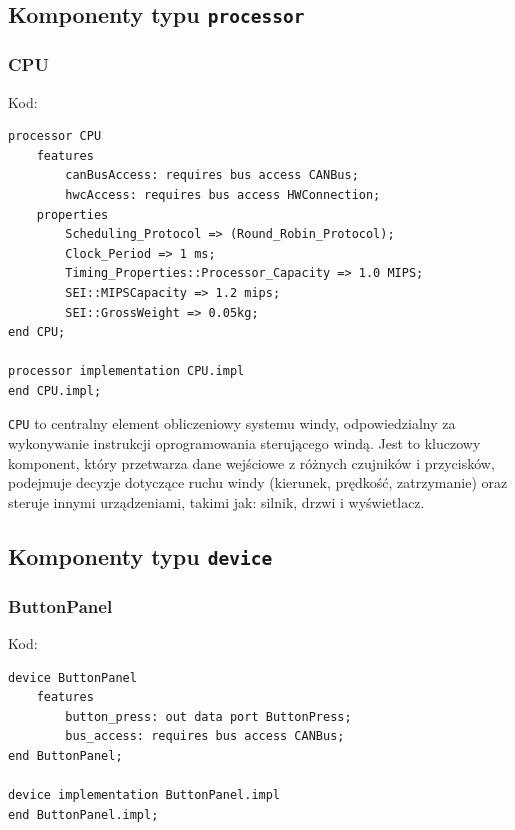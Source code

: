 \documentclass{article}
\begin{document}
    \subsection{Komponenty typu \texttt{processor}}

    
    \subsubsection{CPU}

    Kod:
    
    \begin{lstlisting}[basicstyle=\ttfamily, keywordstyle=\bfseries]
processor CPU
    features
        canBusAccess: requires bus access CANBus;
        hwcAccess: requires bus access HWConnection;
    properties
        Scheduling_Protocol => (Round_Robin_Protocol);
        Clock_Period => 1 ms;	
        Timing_Properties::Processor_Capacity => 1.0 MIPS;
        SEI::MIPSCapacity => 1.2 mips;
        SEI::GrossWeight => 0.05kg;
end CPU;

processor implementation CPU.impl
end CPU.impl;
    \end{lstlisting}

    \texttt{CPU} to centralny element obliczeniowy systemu windy, odpowiedzialny za wykonywanie instrukcji oprogramowania sterującego windą. Jest to kluczowy komponent, który przetwarza dane wejściowe z różnych czujników i przycisków, podejmuje decyzje dotyczące ruchu windy (kierunek, prędkość, zatrzymanie) oraz steruje innymi urządzeniami, takimi jak: silnik, drzwi i wyświetlacz. 




    \subsection{Komponenty typu \texttt{device}}

    
    \subsubsection{ButtonPanel}

    Kod:
    
    \begin{lstlisting}[basicstyle=\ttfamily, keywordstyle=\bfseries]
device ButtonPanel
    features
        button_press: out data port ButtonPress;
        bus_access: requires bus access CANBus;
end ButtonPanel;

device implementation ButtonPanel.impl
end ButtonPanel.impl;
    \end{lstlisting}
\end{document}
